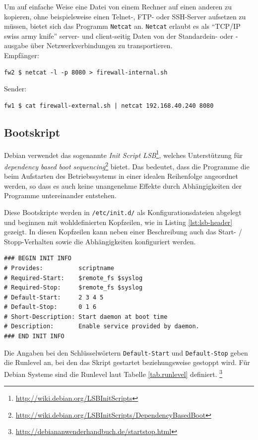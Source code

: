 Um auf einfache Weise eine Datei von einem Rechner auf einen anderen zu
kopieren, ohne beispielsweise einen Telnet-, FTP- oder SSH-Server aufsetzen zu
müssen, bietet sich das Programm {\tt Netcat} an.
{\tt Netcat} erlaubt es als "`TCP/IP swiss army knife"'
server- und client-seitig Daten von der Standardein- oder -ausgabe über
Netzwerkverbindungen zu transportieren.\\

\noindent Empfänger:
\begin{verbatim}
fw2 $ netcat -l -p 8080 > firewall-internal.sh
\end{verbatim}

\noindent Sender:
\begin{verbatim}
fw1 $ cat firewall-external.sh | netcat 192.168.40.240 8080
\end{verbatim}


\subsection{Bootskript}

Debian verwendet das sogenannte \emph{Init Script LSB}\footnote{
\url{http://wiki.debian.org/LSBInitScripts}}, welches Unterstützung
für \emph{dependency based boot sequencing}\footnote{
\url{http://wiki.debian.org/LSBInitScripts/DependencyBasedBoot}
} bietet. Das bedeutet, dass
die Programme die beim Aufstarten des Betriebssystems in einer idealen
Reihenfolge angeordnet werden, so dass es auch keine unangenehme Effekte
durch Abhängigkeiten der Programme untereinander entstehen.

Diese Bootskripte werden in {\tt /etc/init.d/} als Konfigurationsdateien
abgelegt und beginnen mit wohldefinierten Kopfzeilen, wie in Listing
\ref{lst:lsb-header} gezeigt.
In diesen Kopfzeilen kann neben einer Beschreibung auch das
Start- / Stopp-Verhalten sowie die Abhängigkeiten konfiguriert werden.

\begin{lstlisting}[label=lst:lsb-header,caption={Init Script LSB: Kopfzeilen.}]
### BEGIN INIT INFO
# Provides:          scriptname
# Required-Start:    $remote_fs $syslog
# Required-Stop:     $remote_fs $syslog
# Default-Start:     2 3 4 5
# Default-Stop:      0 1 6
# Short-Description: Start daemon at boot time
# Description:       Enable service provided by daemon.
### END INIT INFO
\end{lstlisting}

Die Angaben bei den Schlüsselwörtern {\tt Default-Start} und {\tt Default-Stop}
geben die Runlevel an, bei den das Skript gestartet beziehungsweise gestoppt
wird.
Für Debian Systeme sind die Runlevel laut Tabelle \ref{tab.runlevel} definiert.
\footnote{
\url{http://debiananwenderhandbuch.de/startstop.html}
}

